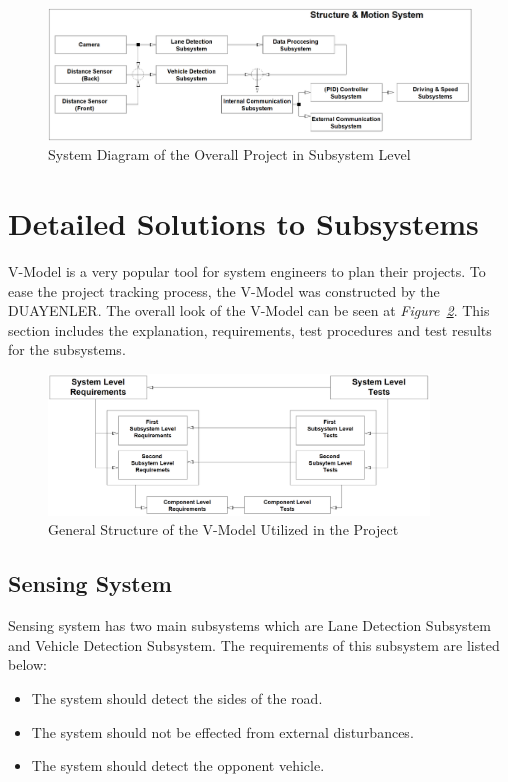 \documentclass[a4paper,12pt]{article}
\begin{document}
	\begin{figure}[H]
		\center
		\setlength{\unitlength}{\textwidth} 
		\includegraphics[width=1.0\textwidth]{system-diagram/system-diagram-3}
		\caption{\label{fig:system-diagram}System Diagram of the Overall Project in Subsystem Level}
	\end{figure}
	
	
	
	
	\section{Detailed Solutions to Subsystems}
	
	V-Model is a very popular tool for system engineers to plan their projects. To ease the project tracking process, the V-Model was constructed by the DUAYENLER. The overall look of the V-Model can be seen at \textit{Figure~\ref{fig:vmodel}}. This section includes the explanation, requirements, test procedures and test results for the subsystems.
		
	\begin{figure}[H]
		\center
		\setlength{\unitlength}{\textwidth} 
		\includegraphics[width=0.9\textwidth]{v-models/V-model}
		\caption{\label{fig:vmodel}General Structure of the V-Model Utilized in the Project}
	\end{figure}
	
	\subsection{Sensing System}
	
	Sensing system has two main subsystems which are Lane Detection Subsystem and Vehicle Detection Subsystem. The requirements of this subsystem are listed below:
	\begin{itemize}
		\item The system should detect the sides of the road.
		\item The system should not be effected from external disturbances.
		\item The system should detect the opponent vehicle.
	\end{itemize}
	
\end{document}
